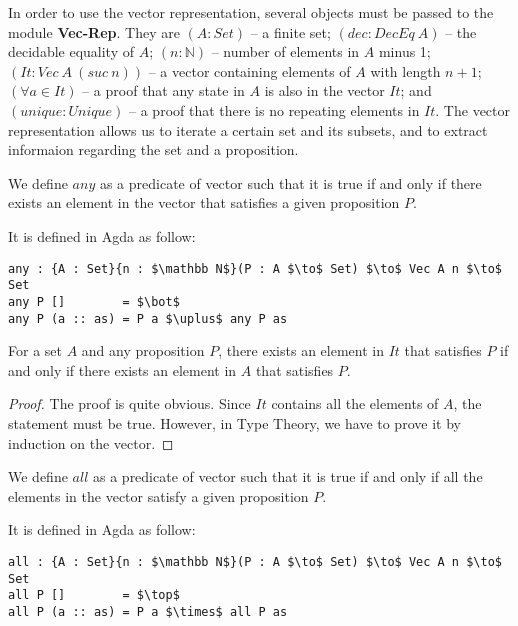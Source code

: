 \par In order to use the vector representation, several objects must
be passed to the module \textbf{Vec-Rep}. They are \((A : Set)\) -- a finite set;
\((dec : DecEq\ A)\) -- the decidable equality of \(A\); \((n : \mathbb
N)\) -- number of elements in \(A\) minus 1; \((It : Vec\ A\ (suc\ n))\) -- a
vector containing elements of \(A\) with length \(n + 1\); \((\forall
a\in It)\) -- a proof that any state in \(A\) is also in the vector
\(It\); and \((unique : Unique)\) -- a proof that there is no repeating
elements in \(It\). The vector representation allows us to iterate a
certain set and its subsets, and to extract informaion regarding the
set and a proposition. 

\begin{defn}
\noindent We define \(any\) as a predicate of vector such that it is
true if and only if there exists an element in the vector that satisfies a given
proposition \(P\). 
\end{defn}

\par It is defined in Agda as follow:
\begin{lstlisting}[mathescape=true,xleftmargin=.3\textwidth]
any : {A : Set}{n : $\mathbb N$}(P : A $\to$ Set) $\to$ Vec A n $\to$ Set
any P []        = $\bot$
any P (a :: as) = P a $\uplus$ any P as
\end{lstlisting} 

\begin{lem}
\noindent For a set \(A\) and any proposition \(P\), there exists an
element in \(It\) that satisfies \(P\) if and only if there exists an
element in \(A\) that satisfies \(P\). 
\end{lem}

\begin{proof}
\noindent The proof is quite obvious. Since \(It\) contains all the
elements of \(A\), the statement must be true. However, in Type
Theory, we have to prove it by induction on the vector.
\end{proof}

\begin{defn}
\noindent We define \(all\) as a predicate of vector such that it is
true if and only if all the elements in the vector satisfy a given
proposition \(P\). 
\end{defn}

\par It is defined in Agda as follow:
\begin{lstlisting}[mathescape=true,xleftmargin=.3\textwidth]
all : {A : Set}{n : $\mathbb N$}(P : A $\to$ Set) $\to$ Vec A n $\to$ Set
all P []        = $\top$
all P (a :: as) = P a $\times$ all P as
\end{lstlisting} 


